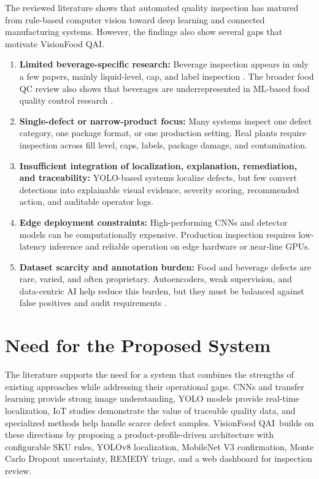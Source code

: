\documentclass[12pt,a4paper]{report}
\newcommand{\shorttitle}{VisionFood QAI}
\begin{document}
The reviewed literature shows that automated quality inspection has matured from rule-based computer vision toward deep learning and connected manufacturing systems. However, the findings also show several gaps that motivate \shorttitle.

\begin{enumerate}
  \item \textbf{Limited beverage-specific research:} Beverage inspection appears in only a few papers, mainly liquid-level, cap, and label inspection \cite{chatchapol2024liquid,farhangi2024machine}. The broader food QC review also shows that beverages are underrepresented in ML-based food quality control research \cite{liakos2025review}.
  \item \textbf{Single-defect or narrow-product focus:} Many systems inspect one defect category, one package format, or one production setting. Real plants require inspection across fill level, caps, labels, package damage, and contamination.
  \item \textbf{Insufficient integration of localization, explanation, remediation, and traceability:} YOLO-based systems localize defects, but few convert detections into explainable visual evidence, severity scoring, recommended action, and auditable operator logs.
  \item \textbf{Edge deployment constraints:} High-performing CNNs and detector models can be computationally expensive. Production inspection requires low-latency inference and reliable operation on edge hardware or near-line GPUs.
  \item \textbf{Dataset scarcity and annotation burden:} Food and beverage defects are rare, varied, and often proprietary. Autoencoders, weak supervision, and data-centric AI help reduce this burden, but they must be balanced against false positives and audit requirements \cite{truong2024autoencoder,xu2024mil,xiong2024artifact}.
\end{enumerate}

\section{Need for the Proposed System}
\label{sec:need-proposed-system}

The literature supports the need for a system that combines the strengths of existing approaches while addressing their operational gaps. CNNs and transfer learning provide strong image understanding, YOLO models provide real-time localization, IoT studies demonstrate the value of traceable quality data, and specialized methods help handle scarce defect samples. \shorttitle\ builds on these directions by proposing a product-profile-driven architecture with configurable SKU rules, YOLOv8 localization, MobileNet V3 confirmation, Monte Carlo Dropout uncertainty, REMEDY triage, and a web dashboard for inspection review.
\end{document}
